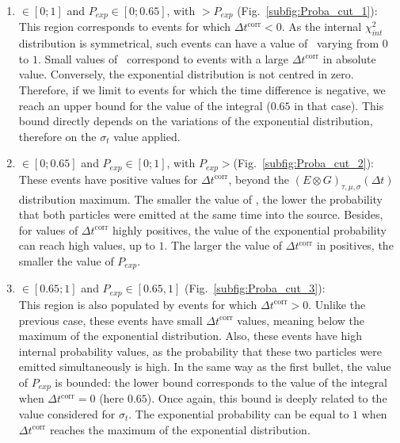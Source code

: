 \begin{enumerate}
\item \Pint$\in[0;1]$ and $P_{exp}\in[0;0.65]$, with \Pint$>P_{exp}$ (Fig.~\ref{subfig:Proba_cut_1}):\\
  This region corresponds to events for which $\Delta t^{\text{corr}}<0$.
  As the internal $\chi^{2}_{int}$ distribution is symmetrical, such events can have a value of \Pint\ varying from $0$ to $1$.
  Small values of \Pint\ correspond to events with a large $\Delta t^{\text{corr}}$ in absolute value.
  Conversely, the exponential distribution is not centred in zero.
  Therefore, if we limit to events for which the time difference is negative, we reach an upper bound for the value of the integral ($0.65$ in that case).
  This bound directly depends on the variations of the exponential distribution, therefore on the $\sigma_{t}$ value applied.
\item \Pint$\in[0;0.65]$ and $P_{exp}\in[0;1]$, with $P_{exp}>$\Pint (Fig.~\ref{subfig:Proba_cut_2}):\\
  These events have positive values for $\Delta t^{\text{corr}}$, beyond the ${(E \otimes G)_{\tau,\mu,\sigma}(\Delta t)}$ distribution maximum.
  The smaller the value of \Pint, the lower the probability that both particles were emitted at the same time into the source.
  Besides, for values of $\Delta t^{\text{corr}}$ highly positives, the value of the exponential probability can reach high values, up to $1$.
  The larger the value of $\Delta t^{\text{corr}}$ in positives, the smaller the value of $P_{exp}$.
\item \Pint$\in[0.65;1]$ and $P_{exp}\in[0.65,1]$ (Fig.~\ref{subfig:Proba_cut_3}):\\
  This region is also populated by events for which $\Delta t^{\text{corr}}>0$.
  Unlike the previous case, these events have small $\Delta t^{\text{corr}}$ values, meaning below the maximum of the exponential distribution.
  Also, these events have high internal probability values, as the probability that these two particles were emitted simultaneously is high.
  In the same way as the first bullet, the value of $P_{exp}$ is bounded: the lower bound corresponds to the value of the integral when $\Delta t^{\text{corr}}=0$ (here $0.65$).
  Once again, this bound is deeply related to the value considered for $\sigma_{t}$.
  The exponential probability can be equal to $1$ when $\Delta t^{\text{corr}}$ reaches the maximum of the exponential distribution.
\end{enumerate}

